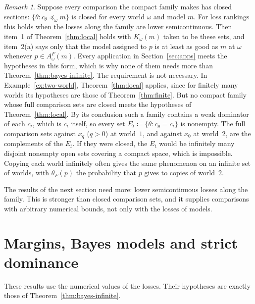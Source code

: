 \documentclass[11pt]{article}
\theoremstyle{definition}
\theoremstyle{remark}
\newtheorem{remark}[theorem]{Remark}
\begin{document}
\begin{remark}\label{rem:closed-comparisons}
Suppose every comparison the compact family makes has closed sections: $\{\theta:c_\theta\preceq_\omega m\}$ is closed for every world $\omega$ and model $m$. For loss rankings this holds when the losses along the family are lower semicontinuous. Then item~1 of Theorem~\ref{thm:local} holds with $K_\omega(m)$ taken to be these sets, and item~2(a) says only that the model assigned to $p$ is at least as good as $m$ at $\omega$ whenever $p\in A^F_\omega(m)$. Every application in Section~\ref{sec:apps} meets the hypotheses in this form, which is why none of them needs more than Theorem~\ref{thm:bayes-infinite}. The requirement is not necessary. In Example~\ref{ex:two-world}, Theorem~\ref{thm:local} applies, since for finitely many worlds its hypotheses are those of Theorem~\ref{thm:finite}. But no compact family whose full comparison sets are closed meets the hypotheses of Theorem~\ref{thm:local}. By its conclusion such a family contains a weak dominator of each $c_t$, which is $c_t$ itself, so every set $E_t\coloneqq\{\theta:c_\theta=c_t\}$ is nonempty. The full comparison sets against $x_q$ ($q>0$) at world~$1$, and against $x_0$ at world~$2$, are the complements of the $E_t$. If they were closed, the $E_t$ would be infinitely many disjoint nonempty open sets covering a compact space, which is impossible. Copying each world infinitely often gives the same phenomenon on an infinite set of worlds, with $\theta_F(p)$ the probability that $p$ gives to copies of world~$2$.
\end{remark}

The results of the next section need more: lower semicontinuous losses along the family. This is stronger than closed comparison sets, and it supplies comparisons with arbitrary numerical bounds, not only with the losses of models.

\section{Margins, Bayes models and strict dominance}\label{sec:margins}
These results use the numerical values of the losses. Their hypotheses are exactly those of Theorem~\ref{thm:bayes-infinite}.
\end{document}
